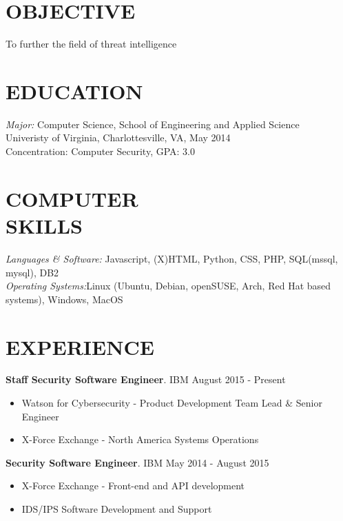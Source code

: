 \documentclass[margin]{res}
\begin{document}
\begin{resume}
 
\section{OBJECTIVE} To further the field of threat intelligence

\section{EDUCATION} {\sl Major:} Computer Science, School of Engineering and Applied Science \\
               Univeristy of Virginia, Charlottesville, VA, 
                May 2014 \\
                Concentration: Computer Security, GPA: 3.0
 
 
\section{COMPUTER \\ SKILLS} {\sl Languages \& Software:} Javascript, (X)HTML, Python,
                 CSS, PHP, SQL(mssql, mysql), DB2\\
                {\sl Operating Systems:}Linux (Ubuntu, Debian, openSUSE, Arch, Red Hat based systems), Windows, MacOS
 
\section{EXPERIENCE}{\textbf{Staff Security Software Engineer}. IBM} \hfill August 2015 - Present
\begin{itemize} \itemsep -2pt
  \item Watson for Cybersecurity - Product Development Team Lead \& Senior Engineer
  \item X-Force Exchange - North America Systems Operations
\end{itemize}

{\textbf{Security Software Engineer}. IBM} \hfill May 2014 - August 2015
\begin{itemize} \itemsep -2pt
  \item X-Force Exchange - Front-end and API development 
  \item IDS/IPS Software Development and Support
\end{itemize}


\end{resume}
\end{document}
